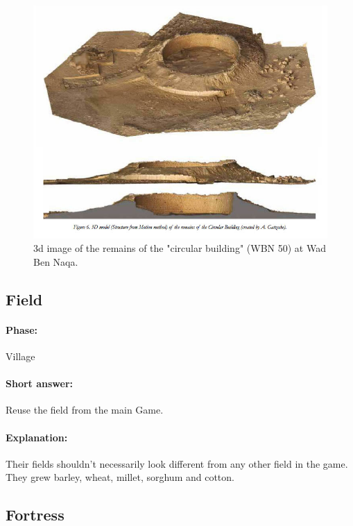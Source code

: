 \documentclass[a4paper,12pt]{scrreprt}
\begin{document}
\begin{figure}[H]
	\centering
	\includegraphics[width=\textwidth]{img/farmstead/3d_reconstruction_circular_building}
	\caption{3d image of the remains of the "circular building" (WBN 50) at Wad Ben Naqa.}
\end{figure}

\subsection{Field}

\paragraph{Phase:} Village\\

\paragraph{Short answer:} Reuse the field from the main Game.

\paragraph{Explanation:}

Their fields shouldn’t necessarily look different from any other field in the game. They grew barley, wheat, millet, sorghum and cotton.

\subsection{Fortress}
\end{document}

